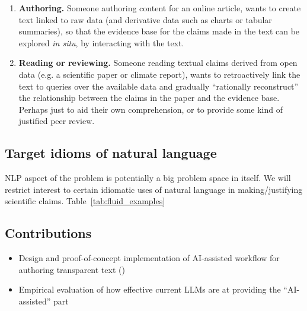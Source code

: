 \begin{enumerate}
\item \textbf{Authoring.} Someone authoring content for an online article, wants to create text
linked to raw data (and derivative data such as charts or tabular summaries), so that the evidence base for
the claims made in the text can be explored \emph{in situ}, by interacting with the text.

\item \textbf{Reading or reviewing.} Someone reading textual claims derived from open data (e.g. a
scientific paper or climate report), wants to retroactively link the text to queries over the available data
and gradually ``rationally reconstruct'' the relationship between the claims in the paper and the evidence
base. Perhaps just to aid their own comprehension, or to provide some kind of justified peer review.
\end{enumerate}



\subsection{Target idioms of natural language}

NLP aspect of the problem is potentially a big problem space in itself. We will restrict interest to certain
idiomatic uses of natural language in making/justifying scientific claims. Table~\ref{tab:fluid_examples}



\subsection{Contributions}

\begin{itemize}
    \item Design and proof-of-concept implementation of AI-assisted workflow for authoring transparent text
    ()
    \item Empirical evaluation of how effective current LLMs are at providing the ``AI-assisted'' part
\end{itemize}
